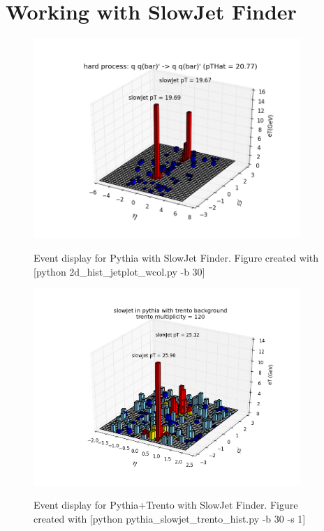 \documentclass[11pt]{article}
\begin{document}
\section{Working with SlowJet Finder}
%
%

\begin{figure}[h]
\begin{center}
\includegraphics[width=0.9\textwidth]{2d_hist_jetplot_wcol.png}
\label{fig_label}
\caption{Event display for Pythia with SlowJet Finder.  Figure created with [python 2d\_hist\_jetplot\_wcol.py -b 30]}
\end{center}
\end{figure}

\begin{figure}[h]
\begin{center}
\includegraphics[width=0.9\textwidth]{pythia_slowjet_trento_hist1.png}
\label{fig_label}
\caption{Event display for Pythia+Trento with SlowJet Finder.  Figure created with [python pythia\_slowjet\_trento\_hist.py -b 30 -s 1]}
\end{center}
\end{figure}
\end{document}
